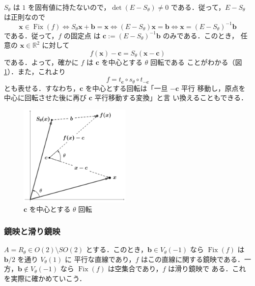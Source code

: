 \documentclass[11pt, uplatex, dvipdfmx, titlepage]{jsarticle}
\DeclareMathOperator{\Fix}{Fix}
\theoremstyle{definition}
\begin{document}
$S_{\theta}$ は $1$ を固有値に持たないので，$\det(E-S_{\theta}) \neq
0$ である．従って，$E-S_{\theta}$ は正則なので
\[
  \bm{x} \in \Fix(f) \Leftrightarrow S_{\theta} \bm{x} +\bm{b} =
  \bm{x} \Leftrightarrow (E-S_{\theta})\bm{x} = \bm{b} \Leftrightarrow
  \bm{x} = \left( E-S_{\theta}\right)^{-1} \bm{b}
\]
である．従って，$f$ の固定点
は $\bm{c}:=\left(E-S_{\theta}\right)^{-1}\bm{b}$ のみである．このとき，
任意の $\bm{x} \in \mathbb{R}^2$ に対して
\[
  f(\bm{x}) - \bm{c} = S_{\theta}(\bm{x}-\bm{c})
\]
である．よって，確かに $f$ は $\bm{c}$ を中心とする $\theta$ 回転である
ことがわかる（図\ref{fig:rotation2gen}）．また，これより
\[
  f = t_{\bm{c}} \circ s_{\theta} \circ t_{-\bm{c}}
\]
とも表せる．すなわち，$\bm{c}$ を中心とする回転は「一旦 $-\bm{c}$ 平行
移動し，原点を中心に回転させた後に再び $\bm{c}$ 平行移動する変換」と言
い換えることもできる．
\begin{figure}[h]
  \centering
  \includegraphics[height=5cm]{pictures/rotation2gen.pdf}
  \caption{$\bm{c}$ を中心とする $\theta$ 回転}
  \label{fig:rotation2gen}
\end{figure}


\subsubsection{鏡映と滑り鏡映}\label{sec:reflection2}

$A=R_{\theta} \in O(2) \setminus SO(2)$
とする．このとき，$\bm{b} \in
V_{\theta}(-1)$ なら $\Fix(f)$ は $\bm{b}/2$ を通り $V_{\theta}(1)$ に
平行な直線であり，$f$ はこの直線に関する鏡映である．一方，$\bm{b}
\notin V_{\theta}(-1)$ なら $\Fix(f)$ は空集合であり，$f$ は滑り鏡映で
ある．これを実際に確かめていこう．
\end{document}
